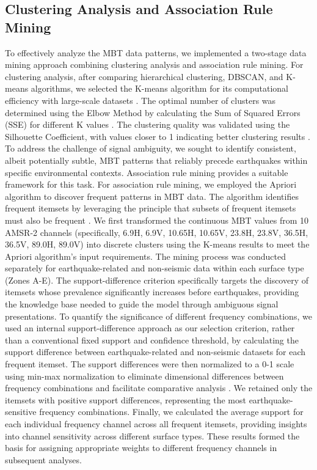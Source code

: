 \documentclass[fleqn,10pt]{wlscirep_mdpi_style}
\begin{document}
\subsection{Clustering Analysis and Association Rule Mining}
To effectively analyze the MBT data patterns, we implemented a two-stage data mining approach combining clustering analysis and association rule mining. For clustering analysis, after comparing hierarchical clustering, DBSCAN, and K-means algorithms, we selected the K-means algorithm for its computational efficiency with large-scale datasets \cite{hanConceptsTechniques2006}. The optimal number of clusters was determined using the Elbow Method by calculating the Sum of Squared Errors (SSE) for different K values \cite{thorndikeWhoBelongsFamily1953}. The clustering quality was validated using the Silhouette Coefficient, with values closer to 1 indicating better clustering results \cite{rousseeuwSilhouettesGraphicalAid1987}.
To address the challenge of signal ambiguity, we sought to identify consistent, albeit potentially subtle, MBT patterns that reliably precede earthquakes within specific environmental contexts. Association rule mining provides a suitable framework for this task. For association rule mining, we employed the Apriori algorithm to discover frequent patterns in MBT data\cite{agrawalMiningAssociationRules1993a}. The algorithm identifies frequent itemsets by leveraging the principle that subsets of frequent itemsets must also be frequent \cite{hanMiningFrequentPatterns2000a}. We first transformed the continuous MBT values from 10 AMSR-2 channels (specifically, 6.9H, 6.9V, 10.65H, 10.65V, 23.8H, 23.8V, 36.5H, 36.5V, 89.0H, 89.0V) into discrete clusters using the K-means results to meet the Apriori algorithm's input requirements. The mining process was conducted separately for earthquake-related and non-seismic data within each surface type (Zones A-E). The support-difference criterion specifically targets the discovery of itemsets whose prevalence significantly increases before earthquakes, providing the knowledge base needed to guide the model through ambiguous signal presentations.
To quantify the significance of different frequency combinations, we used an internal support-difference approach as our selection criterion, rather than a conventional fixed support and confidence threshold, by calculating the support difference between earthquake-related and non-seismic datasets for each frequent itemset. The support differences were then normalized to a 0-1 scale using min-max normalization to eliminate dimensional differences between frequency combinations and facilitate comparative analysis \cite{hanConceptsTechniques2006}. We retained only the itemsets with positive support differences, representing the most earthquake-sensitive frequency combinations. Finally, we calculated the average support for each individual frequency channel across all frequent itemsets, providing insights into channel sensitivity across different surface types. These results formed the basis for assigning appropriate weights to different frequency channels in subsequent analyses.
\end{document}
